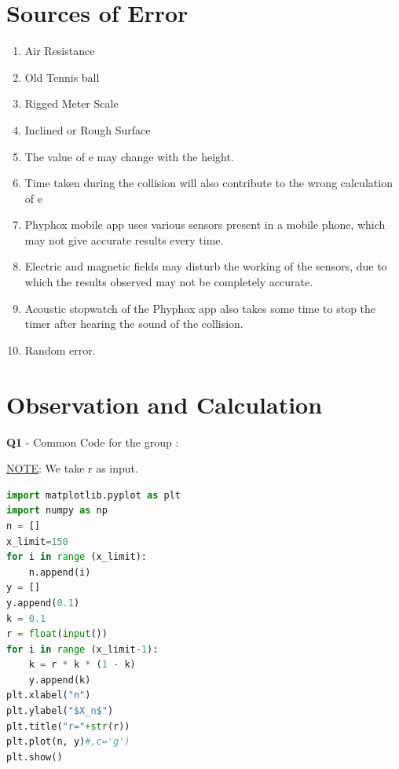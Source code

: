 \documentclass[11pt]{scrartcl} %
\begin{document}
\section{Sources of Error}
\begin{enumerate}
	\item Air Resistance
	\item Old Tennis ball
	\item Rigged Meter Scale
	\item Inclined or Rough Surface
	\item The value of e may change with the height.
	\item Time taken during the collision will also contribute to the wrong calculation of e
	\item Phyphox mobile app uses various sensors present in a mobile phone, which may not give accurate results every time.
	\item Electric and magnetic fields may disturb the working of the sensors, due to which the results observed may not be completely accurate.
	\item Acoustic stopwatch of the Phyphox app also takes some time to stop the timer after hearing the sound of the collision.
	\item Random error.
\end{enumerate}
\newpage

\section{Observation and Calculation}
\textbf{Q1} - Common Code for the group :\par
\underline{NOTE}: We take r as input.\par
\begin{lstlisting}[language=Python, caption= Code for plotting $X_n$ vs n graph for a given r]
import matplotlib.pyplot as plt
import numpy as np
n = []
x_limit=150
for i in range (x_limit):
    n.append(i)
y = []
y.append(0.1)
k = 0.1
r = float(input())
for i in range (x_limit-1):
    k = r * k * (1 - k)
    y.append(k)
plt.xlabel("n")
plt.ylabel("$X_n$")
plt.title("r="+str(r))
plt.plot(n, y)#,c='g')
plt.show() 
\end{lstlisting}
\newpage
\end{document}
